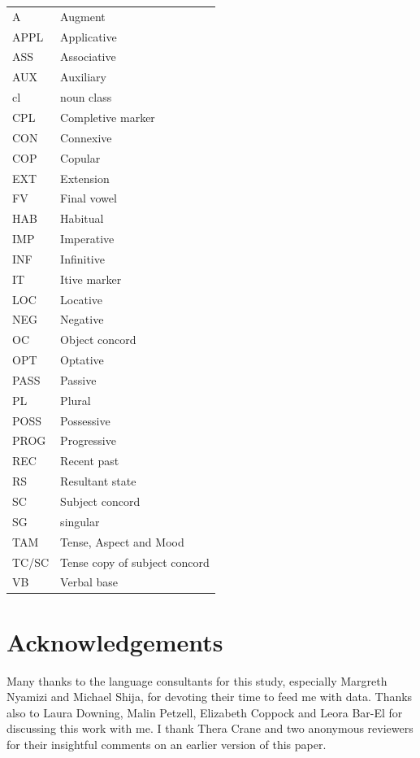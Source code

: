 \documentclass[output=paper]{langscibook}
\begin{document}
\begin{tabular}{l l}
A & Augment\\
APPL & Applicative\\
ASS & Associative\\
AUX & Auxiliary\\
cl & noun class\\
CPL & Completive marker\\
CON & Connexive\\
COP & Copular\\
EXT & Extension\\
FV & Final vowel\\
HAB & Habitual\\
IMP & Imperative\\
INF & Infinitive\\
IT & Itive marker\\
LOC & Locative\\
NEG & Negative\\
OC & Object concord\\
OPT & Optative\\
PASS & Passive\\
PL & Plural\\
POSS & Possessive\\
PROG & Progressive\\
REC & Recent past\\
RS & Resultant state\\
SC & Subject concord\\
SG & singular\\
TAM & Tense, Aspect and Mood\\
TC/SC & Tense copy of subject concord\\
VB & Verbal base\\
\end{tabular}

\section*{Acknowledgements}
Many thanks to the language consultants for this study, especially Margreth Nyamizi and Michael Shija, for devoting their time to feed me with data. Thanks also to Laura Downing, Malin Petzell, Elizabeth Coppock and Leora Bar-El for discussing this work with me. I thank Thera Crane and two anonymous reviewers for their insightful comments on an earlier version of this paper.  

{\sloppy
\printbibliography[heading=subbibliography,notkeyword=this] 
}
\end{document}
